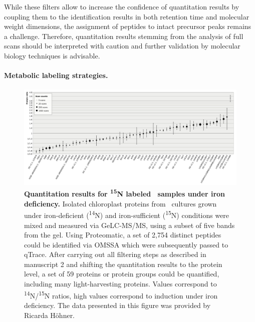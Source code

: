 While these filters allow to increase the confidence of quantitation results
by coupling them to the identification results in both retention time and
molecular weight dimensions, the assignment of peptides to intact precursor
peaks remains a challenge.
Therefore, quantitation results stemming from the analysis of full scans
should be interpreted with caution and further validation by molecular
biology techniques is advisable.

\paragraph{Metabolic labeling strategies.}

\begin{figure}
\includegraphics[width=\textwidth]{figures/qtrace-diagram.jpg}
\caption{
{\bf Quantitation results for \textsuperscript{15}N labeled \cre~samples
    under iron deficiency.} 
    Isolated chloroplast proteins from \cre~cultures grown under 
    iron-deficient (\textsuperscript{14}N) and iron-sufficient
    (\textsuperscript{15}N) conditions were mixed and measured via
    GeLC-MS/MS, using a subset of five bands from the gel.
    Using Proteomatic, a set of 2,754 distinct peptides could be identified
    via OMSSA which were subsequently passed to qTrace. 
    After carrying out all filtering steps as described in manuscript 2
    and shifting the quantitation results to the protein level,
    a set of 59 proteins or protein groups could be quantified,
    including many light-harvesting proteins.
    Values correspond to \textsuperscript{14}N/\textsuperscript{15}N ratios,
    high values correspond to induction under iron deficiency.
    The data presented in this figure was provided by Ricarda H\"ohner.
}
\label{fig:qtrace-15n}
\end{figure}

